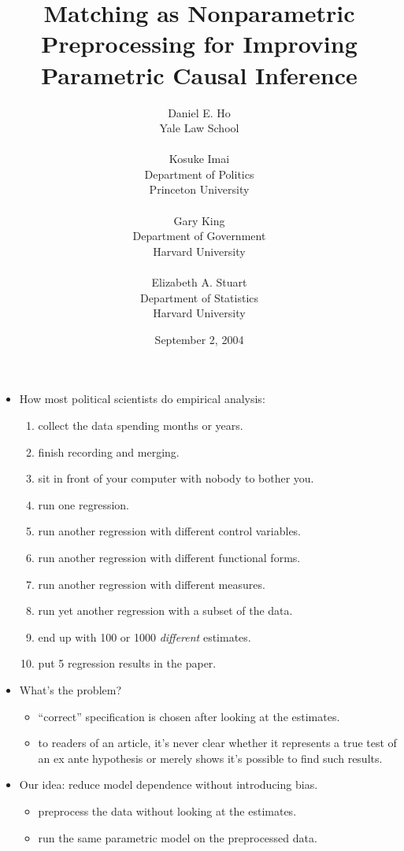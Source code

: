 \documentclass[20pt,landscape,pdftex]{foils}
\title{Matching as Nonparametric Preprocessing for Improving
  Parametric Causal Inference}
\date{September 2, 2004}
\author{Daniel E. Ho \\
  Yale Law School\\
  \\
  Kosuke Imai\\
  Department of Politics\\ Princeton University \\
  \\ 
  Gary King\\
  Department of Government\\ Harvard University\\
  \\
  Elizabeth A. Stuart\\
  Department of Statistics\\ Harvard University
\mbox{}\pdfbookmark{TitlePage}{stlab0}}
\begin{document}
\color{black}
\LOGOOFF
\maketitle



\hypersetup{pdfpagetransition=Replace}

\begin{itemize}
\item How most political scientists do empirical analysis:\pause
  \begin{enumerate}
  \item collect the data spending months or years.\pause
  \item finish recording and merging.\pause
  \item sit in front of your computer with nobody to bother you.\pause
  \item run one regression.\pause
  \item run another regression with different control variables.\pause
  \item run another regression with different functional forms.\pause
  \item run another regression with different measures.\pause
  \item run yet another regression with a subset of the data.\pause
  \item end up with 100 or 1000 {\it different} estimates.\pause
  \item put 5 regression results in the paper.\pause 
  \end{enumerate}
\item What's the problem?\pause
  \begin{itemize}
  \item ``correct'' specification is chosen after looking at the
    estimates.\pause  
  \item to readers of an article, it's never clear whether it
    represents a true test of an ex ante hypothesis or merely shows
    it's possible to find such results.\pause
  \end{itemize}

\item Our idea: reduce model dependence without introducing
  bias.\pause
  \begin{itemize}
  \item preprocess the data without looking at the estimates.\pause
  \item run the same parametric model on the preprocessed data.\pause
  \end{itemize} 
\end{itemize}
\end{document}
